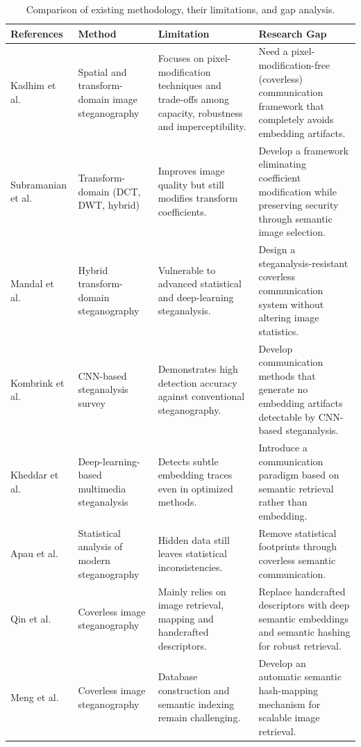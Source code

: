 \documentclass[11pt]{article}
\theoremstyle{definition}
\begin{document}
\begin{table}[H]
\centering
\caption{Comparison of existing methodology, their limitations, and gap analysis.}\label{tab:gap}
\footnotesize
\renewcommand{\arraystretch}{1.25}
\begin{tabular}{@{}p{2.05cm}p{2.55cm}p{4.05cm}p{4.35cm}@{}}
\toprule
{\normalsize\bfseries References} & {\normalsize\bfseries Method} &
{\normalsize\bfseries Limitation} & {\normalsize\bfseries Research Gap} \\
\midrule
Kadhim et al.\ \cite{kadhim} & Spatial and transform-domain image steganography & Focuses on pixel-modification techniques and trade-offs among capacity, robustness and imperceptibility. & Need a pixel-modification-free (coverless) communication framework that completely avoids embedding artifacts. \\
Subramanian et al.\ \cite{subramanian} & Transform-domain (DCT, DWT, hybrid) & Improves image quality but still modifies transform coefficients. & Develop a framework eliminating coefficient modification while preserving security through semantic image selection. \\
Mandal et al.\ \cite{mandal} & Hybrid transform-domain steganography & Vulnerable to advanced statistical and deep-learning steganalysis. & Design a steganalysis-resistant coverless communication system without altering image statistics. \\
Kombrink et al.\ \cite{kombrink} & CNN-based steganalysis survey & Demonstrates high detection accuracy against conventional steganography. & Develop communication methods that generate no embedding artifacts detectable by CNN-based steganalysis. \\
Kheddar et al.\ \cite{kheddar} & Deep-learning-based multimedia steganalysis & Detects subtle embedding traces even in optimized methods. & Introduce a communication paradigm based on semantic retrieval rather than embedding. \\
Apau et al.\ \cite{apau} & Statistical analysis of modern steganography & Hidden data still leaves statistical inconsistencies. & Remove statistical footprints through coverless semantic communication. \\
Qin et al.\ \cite{qin} & Coverless image steganography & Mainly relies on image retrieval, mapping and handcrafted descriptors. & Replace handcrafted descriptors with deep semantic embeddings and semantic hashing for robust retrieval. \\
Meng et al.\ \cite{mengReview} & Coverless image steganography & Database construction and semantic indexing remain challenging. & Develop an automatic semantic hash-mapping mechanism for scalable image retrieval. \\

\end{tabular}
\end{table}
\end{document}

